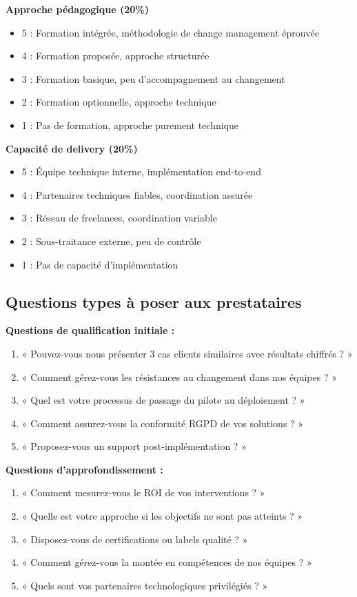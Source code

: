 \textbf{Approche pédagogique (20\%)}
\begin{itemize}
    \item 5 : Formation intégrée, méthodologie de change management éprouvée
    \item 4 : Formation proposée, approche structurée
    \item 3 : Formation basique, peu d'accompagnement au changement
    \item 2 : Formation optionnelle, approche technique
    \item 1 : Pas de formation, approche purement technique
\end{itemize}

\textbf{Capacité de delivery (20\%)}
\begin{itemize}
    \item 5 : Équipe technique interne, implémentation end-to-end
    \item 4 : Partenaires techniques fiables, coordination assurée
    \item 3 : Réseau de freelances, coordination variable
    \item 2 : Sous-traitance externe, peu de contrôle
    \item 1 : Pas de capacité d'implémentation
\end{itemize}

\subsection{Questions types à poser aux prestataires}

\textbf{Questions de qualification initiale :}
\begin{enumerate}
    \item « Pouvez-vous nous présenter 3 cas clients similaires avec résultats chiffrés ? »
    \item « Comment gérez-vous les résistances au changement dans nos équipes ? »
    \item « Quel est votre processus de passage du pilote au déploiement ? »
    \item « Comment assurez-vous la conformité RGPD de vos solutions ? »
    \item « Proposez-vous un support post-implémentation ? »
\end{enumerate}

\textbf{Questions d'approfondissement :}
\begin{enumerate}
    \item « Comment mesurez-vous le ROI de vos interventions ? »
    \item « Quelle est votre approche si les objectifs ne sont pas atteints ? »
    \item « Disposez-vous de certifications ou labels qualité ? »
    \item « Comment gérez-vous la montée en compétences de nos équipes ? »
    \item « Quels sont vos partenaires technologiques privilégiés ? »
\end{enumerate}

